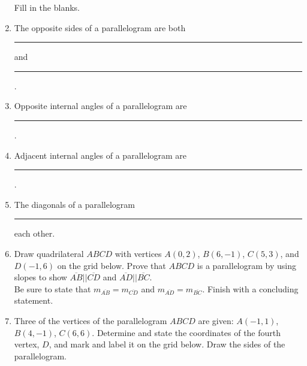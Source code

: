 \documentclass[12pt, twoside]{article}
\begin{document}
\begin{enumerate}
\newpage
Fill in the blanks.
\item The opposite sides of a parallelogram are both \rule{4cm}{0.1mm} and \rule{4cm}{0.1mm}. \vspace{0.3cm}
\item Opposite internal angles of a parallelogram are \rule{4cm}{0.1mm} . \vspace{0.5cm}
\item Adjacent internal angles of a parallelogram are \rule{4cm}{0.1mm}.  \vspace{0.5cm}
\item The diagonals of a parallelogram \rule{4cm}{0.1mm} each other.  \vspace{0.5cm}

\item Draw quadrilateral $ABCD$ with vertices $A(0, 2)$, $B(6,-1)$, $C(5,3)$, and $D(-1,6)$ on the grid below. Prove that $ABCD$ is a parallelogram by using slopes to show $\overline{AB} || \overline{CD}$ and $\overline{AD} || \overline{BC}$. \\[0.5cm]
Be sure to state that $m_{\overline{AB}}=m_{\overline{CD}}$ and $m_{\overline{AD}}=m_{\overline{BC}}$. Finish with a concluding statement.\\[1cm]

\newpage
\item Three of the vertices of the parallelogram $ABCD$ are given: $A(-1, 1)$, $B(4,-1)$, $C(6, 6)$. Determine and state the coordinates of the fourth vertex, $D$, and mark and label it on the grid below. Draw the sides of the parallelogram.
  \begin{center}
  \end{center}


\end{enumerate}
\end{document}
